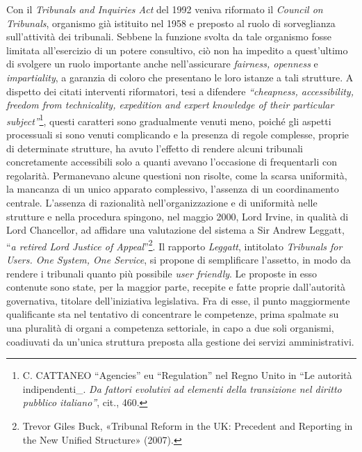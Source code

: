 \documentclass[12pt,it,a4paper,]{report}
\begin{document}
Con il \emph{Tribunals and Inquiries Act} del 1992 veniva riformato il
\emph{Council on Tribunals}, organismo già istituito nel 1958 e preposto
al ruolo di sorveglianza sull'attività dei tribunali. Sebbene la
funzione svolta da tale organismo fosse limitata all'esercizio di un
potere consultivo, ciò non ha impedito a quest'ultimo di svolgere un
ruolo importante anche nell'assicurare \emph{fairness, openness} e
\emph{impartiality}, a garanzia di coloro che presentano le loro istanze
a tali strutture. A dispetto dei citati interventi riformatori, tesi a
difendere \emph{``cheapness, accessibility, freedom from technicality,
expedition and expert knowledge of their particular
subject''}\footnote{C. CATTANEO ``Agencies'' eu ``Regulation'' nel Regno
  Unito in ``Le autorità indipendenti\_. \emph{Da fattori evolutivi ad
  elementi della transizione nel diritto pubblico italiano''}, cit.,
  460.}, questi caratteri sono gradualmente venuti meno, poiché gli
aspetti processuali si sono venuti complicando e la presenza di regole
complesse, proprie di determinate strutture, ha avuto l'effetto di
rendere alcuni tribunali concretamente accessibili solo a quanti avevano
l'occasione di frequentarli con regolarità. Permanevano alcune questioni
non risolte, come la scarsa uniformità, la mancanza di un unico apparato
complessivo, l'assenza di un coordinamento centrale. L'assenza di
razionalità nell'organizzazione e di uniformità nelle strutture e nella
procedura spingono, nel maggio 2000, Lord Irvine, in qualità di Lord
Chancellor, ad affidare una valutazione del sistema a Sir Andrew
Leggatt, ``\emph{a retired Lord Justice of Appeal}''\footnote{{Trevor
  Giles Buck, {«Tribunal Reform in the {UK}: {Precedent} and Reporting
  in the New Unified Structure»} (2007).}}. Il rapporto \emph{Leggatt},
intitolato \emph{Tribunals for Users. One System, One Service}, si
propone di semplificare l'assetto, in modo da rendere i tribunali quanto
più possibile \emph{user friendly}. Le proposte in esso contenute sono
state, per la maggior parte, recepite e fatte proprie dall'autorità
governativa, titolare dell'iniziativa legislativa. Fra di esse, il punto
maggiormente qualificante sta nel tentativo di concentrare le
competenze, prima spalmate su una pluralità di organi a competenza
settoriale, in capo a due soli organismi, coadiuvati da un'unica
struttura preposta alla gestione dei servizi amministrativi.
\end{document}
